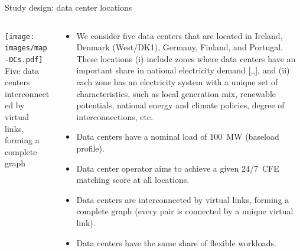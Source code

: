 \begin{frame}{Study design: data center locations}
  
  {\footnotesize
  \begin{columns}[T]

  \begin{column}{7cm}
  \centering
  \vspace{0.5cm}
  \texttt{[image: images/map-DCs.pdf]}
  {\scriptsize Five data centers interconnected by virtual links, \\ 
  forming a complete graph}
  \end{column}

  \begin{column}{8cm}
  \begin{itemize}
    \item We consider \alert{five data centers} that are located in Ireland, Denmark (West/DK1), Germany, Finland, and Portugal. These locations (i) include zones where data centers have an important share in national electricity demand [,,], and (ii) each zone has an electricity system with a unique set of characteristics, such as local generation mix, renewable potentials, national energy and climate policies, degree of interconnections, etc. 
    \item Data centers have a nominal load of \alert{100~MW} (baseload profile).
    \item Data center operator aims to achieve a \alert{given 24/7~CFE matching score} at all locations. 
    \item Data centers are interconnected by virtual links, forming a \alert{complete graph} (every pair is connected by a unique virtual link).
    \item Data centers have the \alert{same share of flexible workloads}. 
  \end{itemize}

  \end{column}
  \end{columns}
  }

\end{frame}



